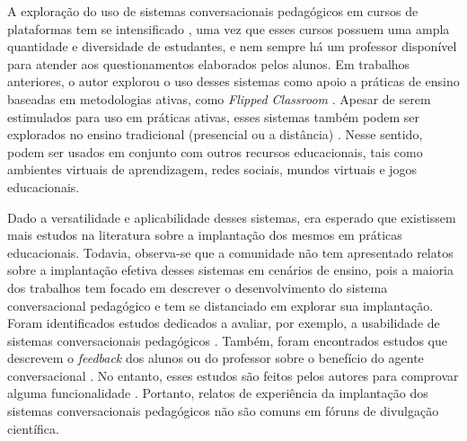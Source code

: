 A exploração do uso de sistemas conversacionais pedagógicos em cursos de plataformas  tem se intensificado \cite{aguirre2018}, uma vez que esses cursos possuem uma ampla quantidade e diversidade de estudantes, e nem sempre há um professor disponível para atender aos questionamentos elaborados pelos alunos. Em trabalhos anteriores, o autor explorou o uso desses sistemas como apoio a práticas de ensino baseadas em metodologias ativas, como \textit{Flipped Classroom} \cite{Paschoal:2019}. Apesar de serem estimulados para uso em práticas ativas, esses sistemas também podem ser explorados no ensino tradicional (presencial ou a distância) \cite{krassmann2018}. Nesse sentido, podem ser usados em conjunto com outros recursos educacionais, tais como ambientes virtuais de aprendizagem, redes sociais, mundos virtuais e jogos educacionais.

Dado a versatilidade e aplicabilidade desses sistemas, era esperado que existissem mais estudos na literatura sobre a implantação dos mesmos em práticas educacionais. Todavia, observa-se que a comunidade não tem apresentado relatos sobre a implantação efetiva desses sistemas em cenários de ensino, pois a maioria dos trabalhos tem focado em descrever o desenvolvimento do sistema conversacional pedagógico e tem se distanciado em explorar sua implantação. Foram identificados estudos dedicados a avaliar, por exemplo, a usabilidade de sistemas conversacionais pedagógicos \cite{paschoal2018}. Também, foram encontrados estudos que descrevem o \textit{feedback} dos alunos ou do professor sobre o benefício do agente conversacional \cite{io2017,winkler2018}. No entanto, esses estudos são feitos pelos autores para comprovar alguma funcionalidade \cite{hobert2019}. Portanto, relatos de experiência da implantação dos sistemas conversacionais pedagógicos não são comuns em fóruns de divulgação científica.


